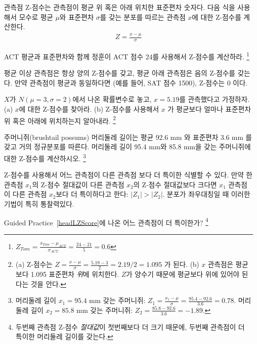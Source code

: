 \begin{termBox}{
관측점 Z-점수는 관측점이 평균 위 혹은 아래 위치한 표준편차 숫자다. 다음 식을 사용해서 모수로 평균 $\mu$와 표준편차 $\sigma$를 갖는 분포를 따르는 관측점 $x$에 대한 Z-점수를 계산한다.
\begin{eqnarray*}
Z = \frac{x-\mu}{\sigma}
\end{eqnarray*}}
\end{termBox}

\begin{exercise}
ACT 평균과 표준편차와 함께 정훈이 ACT 점수 24를 사용해서 Z-점수를 계산하라.
\footnote{$Z_{Tom} = \frac{x_{Tom} - \mu_{ACT}}{\sigma_{ACT}} = \frac{24 - 21}{5} = 0.6$}
\end{exercise}

평균 이상 관측점은 항상 양의 Z-점수를 갖고, 평균 아래 관측점은 음의 Z-점수를 갖는다. 만약 관측점이 평균과 동일하다면 (예를 들어, SAT 점수 1500), Z-점수는 $0$ 이다.

\begin{exercise}
$X$가 $N(\mu=3, \sigma=2)$에서 나온 확률변수로 놓고, $x=5.19$를 관측했다고 가정하자.
(a) $x$에 대한 Z-점수를 찾아라. (b) Z-점수를 사용해서 $x$ 가 평균보다 얼마나 표준편차 위 혹은 아래에 위치하는지 알아내라.
\footnote{(a) Z-점수는 $Z = \frac{x-\mu}{\sigma} = \frac{5.19 - 3}{2} = 2.19/2 = 1.095$ 가 된다. 
(b) $x$ 관측점은 평균보다 1.095 표준편차 \emph{위}에 위치한다. $Z$가 양수기 때문에 평균보다 위에 있어야 된다는 것을 안다.}
\end{exercise}

\begin{exercise} \label{headLZScore}

주머니쥐(brushtail possums) 머리둘레 길이는 평균 92.6 mm 와 표준편차 3.6 mm 를 갖고 거의 정규분포를 따른다. 머리둘레 길이 95.4 mm와  85.8 mm을 갖는 주머니쥐에 대한 Z-점수를 계산하시오. 
\footnote{머리둘레 길이 $x_1=95.4$ mm 갖는 주머니쥐: $Z_1 = \frac{x_1 - \mu}{\sigma} = \frac{95.4 - 92.6}{3.6} = 0.78$. 머리둘레 길이 $x_2=85.8$ mm 갖는 주머니쥐: $Z_2 = \frac{85.8 - 92.6}{3.6} = -1.89$.}
\end{exercise}

Z-점수를 사용해서 어느 관측점이 다른 관측점 보다 더 특이한 식별할 수 있다. 만약 한 관측점 $x_1$의 Z-점수 절대값이 다른 관측점 $x_2$의 Z-점수 절대값보다 크다면 $x_1$ 관측점이 다른 관측점 $x_2$보다 더 특이하다고 한다: $|Z_1| > |Z_2|$. 분포가 좌우대칭일 때 이러한 기법이 특히 통찰력있다.

\begin{exercise}
Guided Practice~\ref{headLZScore}에 나온 어느 관측점이 더 특이한가?
\footnote{
두번째 관측점 Z-점수 \emph{절대값}이 첫번째보다 더 크기 때문에, 두번째 관측점이 더 특이한 머리둘레 길이를 갖는다.}
\end{exercise}

